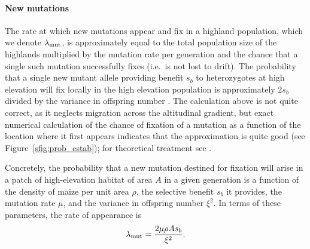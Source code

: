 \paragraph{New mutations}
The rate at which new mutations appear and fix in a highland population, which we denote $\lambda_{\text{mut}}$, 
is approximately equal to the total population size of the highlands multiplied by the mutation rate per generation 
and the chance that a single such mutation successfully fixes (i.e.\ is not lost to drift).
The probability that a single new mutant allele providing benefit $s_b$ to heterozygotes at high elevation will fix locally in the high elevation population is approximately $2s_b$ divided by the variance in offspring number \citep{jagers1975branching}.
The calculation above is not quite correct, as it neglects migration across the altitudinal gradient, but exact numerical calculation of the chance of fixation of a mutation as a function of the location where it first appears indicates that the approximation is quite good (see Figure~\ref{sfig:prob_estab}); for theoretical treatment see \citet{barton1987establishment}.

Concretely, the probability that a new mutation destined for fixation will arise in a patch of high-elevation habitat of area $A$ in a given generation is a function of the density of maize per unit area $\rho$, the selective benefit $s_b$ it provides, the mutation rate $\mu$, and the variance in offspring number $\xi^2$.
In terms of these parameters, the rate of appearance is 
\begin{align} \label{eqn:mutrate}
  \lambda_{\text{mut}} = \frac{2 \mu \rho A s_b}{\xi^2} .
\end{align}

